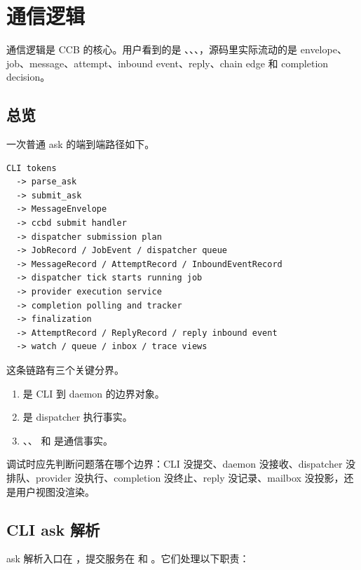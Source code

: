 \chapter{通信逻辑}

通信逻辑是 CCB 的核心。用户看到的是 、、、，源码里实际流动的是 envelope、job、message、attempt、inbound event、reply、chain edge 和 completion decision。

\section{总览}

一次普通 ask 的端到端路径如下。

\begin{Verbatim}[fontsize=\small,frame=single]
CLI tokens
  -> parse_ask
  -> submit_ask
  -> MessageEnvelope
  -> ccbd submit handler
  -> dispatcher submission plan
  -> JobRecord / JobEvent / dispatcher queue
  -> MessageRecord / AttemptRecord / InboundEventRecord
  -> dispatcher tick starts running job
  -> provider execution service
  -> completion polling and tracker
  -> finalization
  -> AttemptRecord / ReplyRecord / reply inbound event
  -> watch / queue / inbox / trace views
\end{Verbatim}

这条链路有三个关键分界。

\begin{enumerate}
  \item {} 是 CLI 到 daemon 的边界对象。
  \item {} 是 dispatcher 执行事实。
  \item {}、、 和  是通信事实。
\end{enumerate}

调试时应先判断问题落在哪个边界：CLI 没提交、daemon 没接收、dispatcher 没排队、provider 没执行、completion 没终止、reply 没记录、mailbox 没投影，还是用户视图没渲染。

\section{CLI ask 解析}

ask 解析入口在 ，提交服务在  和 。它们处理以下职责：

